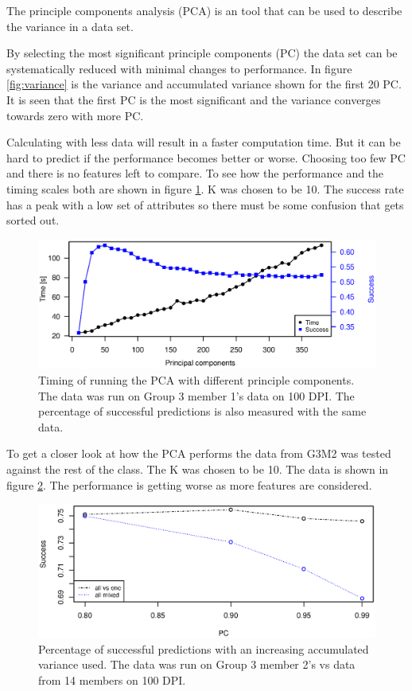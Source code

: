 The principle components analysis (PCA) is an tool that can be used to describe the variance in a data set.

By selecting the most significant principle components (PC) the data set can be systematically reduced with minimal changes to performance.
In figure \ref{fig:variance} is the variance and accumulated variance shown for the first 20 PC. 
It is seen that the first PC is the most significant and the variance converges towards zero with more PC.

Calculating with less data will result in a faster computation time. But it can be hard to predict if the performance becomes better or worse.
Choosing too few PC and there is no features left to compare.
To see how the performance and the timing scales both are shown in figure \ref{fig:pca_timing}. K was chosen to be 10.
The success rate has a peak with a low set of attributes so there must be some confusion that gets sorted out. 

\begin{figure}[H]
\centering
\includegraphics[width =0.8 \textwidth]{graphics/pca_timing_nikolaj}
\caption[Timing of PCA]{Timing of running the PCA with different principle components. 
The data was run on Group 3 member 1's data on 100 DPI. 
The percentage of successful predictions is also measured with the same data.}
\label{fig:pca_timing}
\end{figure}

To get a closer look at how the PCA performs the data from G3M2 was tested against the rest of the class. 
The K was chosen to be 10. 
The data is shown in figure \ref{fig:pca_success}.
The performance is getting worse as more features are considered.

\begin{figure}[H]
\centering
\includegraphics[width =0.95 \textwidth]{graphics/pca_success}
\caption[PCA performance]{Percentage of successful predictions with an increasing accumulated variance used.
The data was run on Group 3 member 2's vs data from 14 members on 100 DPI. }
\label{fig:pca_success}
\end{figure}

